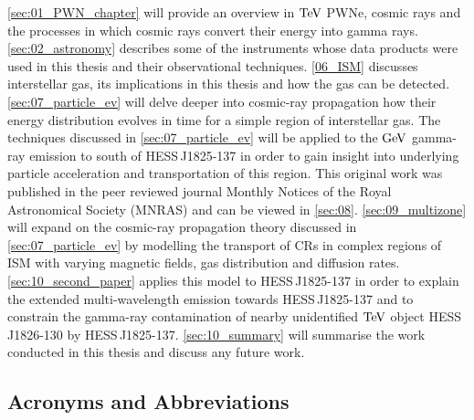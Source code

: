 \autoref{sec:01_PWN_chapter} will provide an overview in $\TeV$ PWNe, cosmic rays and the processes in which cosmic rays convert their energy into gamma rays. \autoref{sec:02_astronomy} describes some of the instruments whose data products were used in this thesis and their observational techniques. \autoref{06_ISM} discusses interstellar gas, its implications in this thesis and how the gas can be detected. \autoref{sec:07_particle_ev} will delve deeper into cosmic-ray propagation how their energy distribution evolves in time for a simple region of interstellar gas. The techniques discussed in \autoref{sec:07_particle_ev} will be applied to the $\si{\giga\electronvolt}$ gamma-ray emission to south of \mbox{HESS\,J1825-137} in order to gain insight into underlying particle acceleration and transportation of this region. This original work was published in the peer reviewed journal Monthly Notices of the Royal Astronomical Society (MNRAS) and can be viewed in \autoref{sec:08}. \autoref{sec:09_multizone} will expand on the cosmic-ray propagation theory discussed in \autoref{sec:07_particle_ev} by modelling the transport of CRs in complex regions of ISM with varying magnetic fields, gas distribution and diffusion rates. \autoref{sec:10_second_paper} applies this model to \mbox{HESS\,J1825-137} in order to explain the extended multi-wavelength emission towards \mbox{HESS\,J1825-137} and to constrain the gamma-ray contamination of nearby unidentified $\TeV$ object \mbox{HESS\,J1826-130} by \mbox{HESS\,J1825-137}. \autoref{sec:10_summary} will summarise the work conducted in this thesis and discuss any future work.

\subsection*{Acronyms and Abbreviations}

